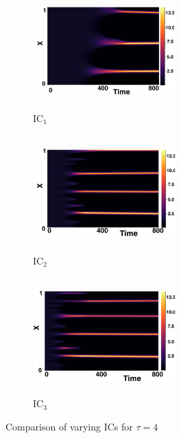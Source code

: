 \documentclass[12pt]{report}
\begin{document}
\begin{figure}[H]
    \centering
    \begin{subfigure}[b]{0.32\textwidth}
        \centering
        \includegraphics[width=5.5cm,height=4.5cm]{gaff4.png}
        \caption{$\text{IC}_1$}
        \label{}
    \end{subfigure}
    \hfill
    \begin{subfigure}[b]{0.32\textwidth}
        \centering
        \includegraphics[width=5.5cm,height=4.5cm]{ic24.png}
        \caption{$\text{IC}_2$}
        \label{}
    \end{subfigure}
    \hfill
    \begin{subfigure}[b]{0.32\textwidth}
        \centering
        \includegraphics[width=5.5cm,height=4.5cm]{ic34.png}
        \caption{$\text{IC}_3$}
        \label{}
    \end{subfigure}
    \caption{Comparison of varying ICs for $\tau=4$}
    \label{fig:figtau4}
\end{figure}
\end{document}
